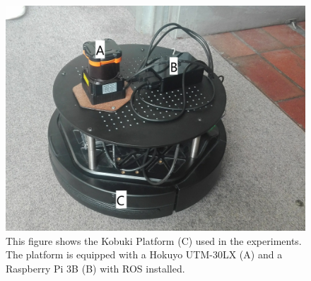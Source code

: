  \begin{figure}[H]
    \centering
    \includegraphics[width=1\textwidth]{figs/real_world_results/turtle_bot.jpg}
    \caption{This figure shows the Kobuki Platform (C) used in the experiments. The platform is equipped with a  Hokuyo UTM-30LX (A) and a Raspberry Pi 3B (B) with ROS installed.}
    \label{fig:turtle_bot_experiments}
\end{figure}



